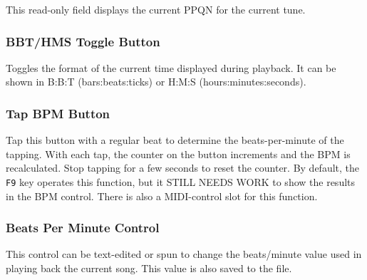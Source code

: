    This read-only field displays the current PPQN for the current tune.


\subsubsection{BBT/HMS Toggle Button}
\label{subsubsec:introduction_time_format_toggle_button}

   Toggles the format of the current time displayed during playback. 
   It can be shown in B:B:T (bars:beats:ticks) or H:M:S (hours:minutes:seconds).

\subsubsection{Tap BPM Button}
\label{subsubsec:introduction_tap_bpm_button}

   Tap this button with a regular beat to determine the beats-per-minute of the
   tapping.  With each tap, the counter on the button increments and the BPM is
   recalculated.  Stop tapping for a few seconds to reset the counter.
   By default, the \texttt{F9} key operates this function, but it
   STILL NEEDS WORK to show the results in the BPM control.
   There is also a MIDI-control slot for this function.

\subsubsection{Beats Per Minute Control}
\label{subsubsec:introduction_bpm_control}

   This control can be text-edited or spun to change the beats/minute value
   used in playing back the current song.  This value is also saved to the
   file.

